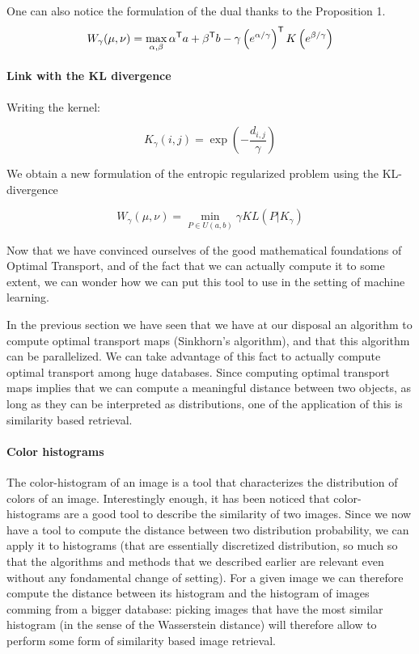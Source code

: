 One can also notice the formulation of the dual thanks to the Proposition 1.
$$ W_\gamma(\mu, \nu) = \max_{\alpha, \beta} \alpha^{\mathsf{T}} a + \beta^{\mathsf{T}} b - \gamma \left( e^{\alpha / \gamma} \right)^{\mathsf{T}} K \left( e^{\beta / \gamma} \right) $$

\paragraph{Link with the KL divergence}
Writing the kernel:

$$ K_\gamma(i, j) = \exp \left( - \dfrac{d_{i, j}}{\gamma} \right) $$

We obtain a new formulation of the entropic regularized problem using the
KL-divergence

$$ W_\gamma(\mu, \nu) = \min_{P \in U(a, b)} \gamma KL(P | K_\gamma) $$


Now that we have convinced ourselves of the good mathematical foundations
of Optimal Transport, and of the fact that we can actually compute it to
some extent, we can wonder how we can put this tool to use in the setting
of machine learning.


In the previous section we have seen that we have at our disposal an
algorithm to compute optimal transport maps (Sinkhorn's algorithm), and that
this algorithm can be parallelized. We can take advantage of this fact to
actually compute optimal transport among huge databases. Since computing
optimal transport maps implies that we can compute a meaningful distance
between two objects, as long as they can be interpreted as distributions,
one of the application of this is similarity based retrieval.

\paragraph{Color histograms}

The color-histogram of an image is a tool that characterizes the
distribution of colors of an image. Interestingly enough, it has been noticed
that color-histograms are a good tool to describe the similarity of two
images. Since we now have a tool to compute the distance between two
distribution probability, we can apply it to histograms (that are essentially
discretized distribution, so much so that the algorithms and methods that
we described earlier are relevant even without any fondamental change of
setting). For a given image we can therefore compute the distance between its
histogram and the histogram of images comming from a bigger database: picking
images that have the most similar histogram (in the sense of the Wasserstein
distance) will therefore allow to perform some form of similarity based
image retrieval.

